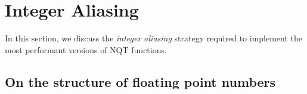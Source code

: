\documentclass[linenumbers,twocolumn]{aastex631}
\begin{document}


\appendix

\section{Integer Aliasing}
\label{sec:integer:aliasing}

In this section, we discuss the \textit{integer aliasing} strategy required to implement the most performant versions of NQT functions.

\subsection{On the structure of floating point numbers}
\label{sec:floats}
\end{document}
